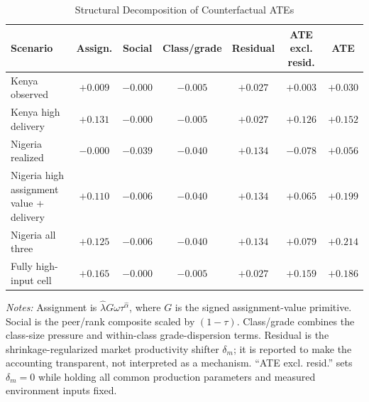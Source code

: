 \begin{table}[H]
\centering
\caption{Structural Decomposition of Counterfactual ATEs}
\label{tab:struct_component_decomp}
\begin{threeparttable}
\scriptsize
\setlength{\tabcolsep}{3pt}
\begin{tabular}[t]{lcccccc}
\toprule
Scenario & Assign. & Social & Class/grade & Residual & ATE excl. resid. & ATE \\
\midrule
Kenya observed & $+0.009$ & $-0.000$ & $-0.005$ & $+0.027$ & $+0.003$ & $+0.030$ \\
Kenya high delivery & $+0.131$ & $-0.000$ & $-0.005$ & $+0.027$ & $+0.126$ & $+0.152$ \\
Nigeria realized & $-0.000$ & $-0.039$ & $-0.040$ & $+0.134$ & $-0.078$ & $+0.056$ \\
Nigeria high assignment value + delivery & $+0.110$ & $-0.006$ & $-0.040$ & $+0.134$ & $+0.065$ & $+0.199$ \\
Nigeria all three & $+0.125$ & $-0.006$ & $-0.040$ & $+0.134$ & $+0.079$ & $+0.214$ \\
Fully high-input cell & $+0.165$ & $-0.000$ & $-0.005$ & $+0.027$ & $+0.159$ & $+0.186$ \\
\bottomrule
\end{tabular}
\begin{tablenotes}
\footnotesize
\item \textit{Notes:} Assignment is $\hat{\lambda}G\omega\tau^{\hat{\alpha}}$, where $G$ is the signed assignment-value primitive. Social is the peer/rank composite scaled by $(1-\tau)$. Class/grade combines the class-size pressure and within-class grade-dispersion terms. Residual is the shrinkage-regularized market productivity shifter $\delta_m$; it is reported to make the accounting transparent, not interpreted as a mechanism. ``ATE excl. resid.'' sets $\delta_m=0$ while holding all common production parameters and measured environment inputs fixed.
\end{tablenotes}
\end{threeparttable}
\end{table}
